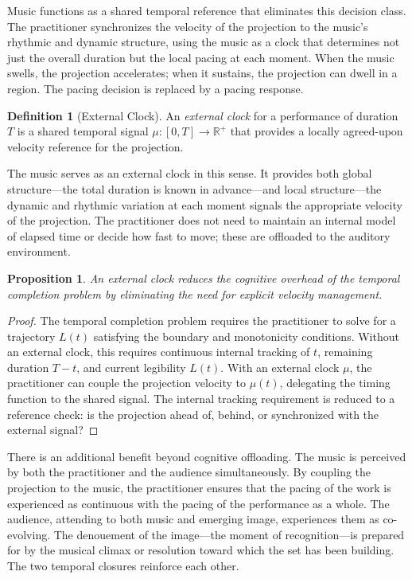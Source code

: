\documentclass[12pt, twoside]{article}
\theoremstyle{plain}
\newtheorem{proposition}[theorem]{Proposition}
\theoremstyle{definition}
\newtheorem{definition}[theorem]{Definition}
\theoremstyle{remark}
\begin{document}
Music functions as a shared temporal reference that eliminates this decision class. The practitioner synchronizes the velocity of the projection to the music's rhythmic and dynamic structure, using the music as a clock that determines not just the overall duration but the local pacing at each moment. When the music swells, the projection accelerates; when it sustains, the projection can dwell in a region. The pacing decision is replaced by a pacing response.

\begin{definition}[External Clock]
An \emph{external clock} for a performance of duration $T$ is a shared temporal signal $\mu : [0, T] \to \mathbb{R}^+$ that provides a locally agreed-upon velocity reference for the projection.
\end{definition}

The music serves as an external clock in this sense. It provides both global structure---the total duration is known in advance---and local structure---the dynamic and rhythmic variation at each moment signals the appropriate velocity of the projection. The practitioner does not need to maintain an internal model of elapsed time or decide how fast to move; these are offloaded to the auditory environment.

\begin{proposition}
\label{prop:music-clock}
An external clock reduces the cognitive overhead of the temporal completion problem by eliminating the need for explicit velocity management.
\end{proposition}

\begin{proof}
The temporal completion problem requires the practitioner to solve for a trajectory $L(t)$ satisfying the boundary and monotonicity conditions. Without an external clock, this requires continuous internal tracking of $t$, remaining duration $T - t$, and current legibility $L(t)$. With an external clock $\mu$, the practitioner can couple the projection velocity to $\mu(t)$, delegating the timing function to the shared signal. The internal tracking requirement is reduced to a reference check: is the projection ahead of, behind, or synchronized with the external signal?
\end{proof}

There is an additional benefit beyond cognitive offloading. The music is perceived by both the practitioner and the audience simultaneously. By coupling the projection to the music, the practitioner ensures that the pacing of the work is experienced as continuous with the pacing of the performance as a whole. The audience, attending to both music and emerging image, experiences them as co-evolving. The denouement of the image---the moment of recognition---is prepared for by the musical climax or resolution toward which the set has been building. The two temporal closures reinforce each other.
\end{document}
